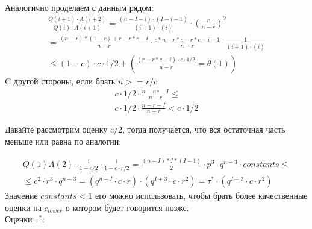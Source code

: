 \documentclass[times,specification,annotation]{itmo-student-thesis}
\begin{document}
    Аналогично проделаем с данным рядом:
    \begin{gather*}
        \frac{Q(i + 1) \cdot A(i + 2)}{Q(i) \cdot A(i + 1)} = \frac{(n - I - i) \cdot (I - i - 1)}{(i + 1) \cdot (i)} \cdot (\frac{r}{n - r})^2 \\
        = \frac{(n - r)*(1 - c) + r - r*c - i}{n - r} \cdot \frac{c*n - r*c - r*c - i - 1}{n - r} \cdot \frac{1}{(i + 1) \cdot (i)} \\
        \leq (1 - c) \cdot c \cdot 1/2 + (\frac{(r - r*c - i) \cdot c \cdot 1/2}{n - r} = \theta(1))
    \end{gather*}
    C другой стороны, если брать $n >= r/c$
    \begin{gather*}
        c \cdot 1/2 \cdot \frac{n - nc - I}{n - r} \leq \\ c \cdot 1/2 \cdot \frac{n - r - I}{n - r} < c \cdot 1/2
    \end{gather*}

    Давайте рассмотрим оценку $c/2$, тогда получается, что вся остаточная часть меньше или равна по аналогии:

    \begin{gather*}
        Q(1)A(2) \cdot \frac{1}{1 - c/2} \cdot \frac{1}{1 - c \cdot r/2} = \frac{(n - I)*I*(I - 1)}{2} \cdot p^3 \cdot q^{n - 3} \cdot constants \leq\\
        \leq c^2 \cdot r^3 \cdot q^{n - 3} = (q^{n - I} \cdot c \cdot r) \cdot  (q^{I + 3} \cdot c \cdot r^2)  = \tau^* \cdot (q^{I + 3} \cdot c \cdot r^2)
    \end{gather*}
    Значение $constants < 1$ его можно использовать, чтобы брать более качественные оценки на $c_{lower}$ о котором будет говорится позже. \\

    Оценки $\tau^*$:
\end{document}
